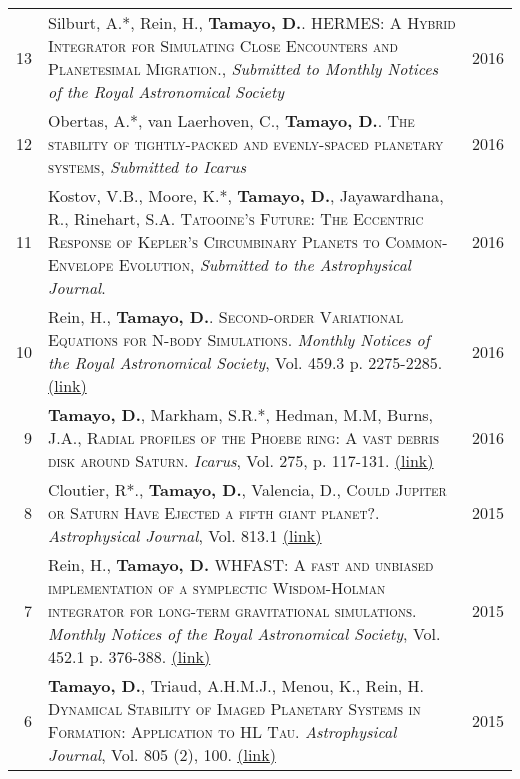\documentclass[10pt]{article} %
\begin{document}
\begin{tabular}{>{\hfill}r|p{14.3cm}l}
13 & Silburt, A.*, Rein, H., {\bf Tamayo, D.}. \textsc{HERMES: A Hybrid Integrator for Simulating Close Encounters and Planetesimal Migration.}, {\it Submitted to Monthly Notices of the Royal Astronomical Society} & 2016 \\

12 & Obertas, A.*, van Laerhoven, C., {\bf Tamayo, D.}. \textsc{The stability of tightly-packed and evenly-spaced planetary systems}, {\it Submitted to Icarus} & 2016 \\

11 & Kostov, V.B., Moore, K.*, {\bf Tamayo, D.}, Jayawardhana, R., Rinehart, S.A. \textsc{Tatooine's Future: The Eccentric Response of Kepler's Circumbinary Planets to Common-Envelope Evolution}, {\it Submitted to the Astrophysical Journal}. & 2016 \\

10 & Rein, H., {\bf Tamayo, D.}. \textsc{Second-order Variational Equations for N-body Simulations.} {\it Monthly Notices of the Royal Astronomical Society}, Vol. 459.3 p. 2275-2285. \href{http://arxiv.org/abs/1603.03424}{(link)} & 2016 \\

9 & {\bf Tamayo, D.}, Markham, S.R.*, Hedman, M.M, Burns, J.A., \textsc{Radial profiles of the Phoebe ring: A vast debris disk around Saturn}.  {\it Icarus}, Vol. 275, p. 117-131. \href{http://arxiv.org/abs/1604.03119}{(link)} & 2016 \\

8 & Cloutier, R*., {\bf Tamayo, D.}, Valencia, D., \textsc{Could Jupiter or Saturn Have Ejected a fifth giant planet?}.  {\it Astrophysical Journal}, Vol. 813.1 \href{http://arxiv.org/abs/1509.05397}{(link)} & 2015 \\

7 & Rein, H., {\bf Tamayo, D.} \textsc{WHFAST: A fast and unbiased implementation of a symplectic Wisdom-Holman integrator for long-term gravitational simulations}. {\it Monthly Notices of the Royal Astronomical Society}, Vol. 452.1 p. 376-388. \href{http://arxiv.org/abs/1506.01084}{(link)} & 2015 \\

6 & {\bf Tamayo, D.}, Triaud, A.H.M.J., Menou, K., Rein, H. \textsc{Dynamical Stability of Imaged Planetary Systems in Formation:  Application to HL Tau}. {\it Astrophysical Journal}, Vol. 805 (2), 100. \href{http://arxiv.org/abs/1502.05099}{(link)} & 2015 \\


\end{tabular}
\end{document}
